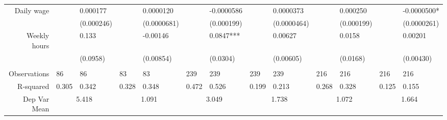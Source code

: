 \begin{tabular}{rrrrrrrrrrrrr}
Daily wage & \multicolumn{1}{l}{} & \multicolumn{1}{l}{0.000177} & \multicolumn{1}{l}{} & \multicolumn{1}{l}{0.0000120} & \multicolumn{1}{l}{} & \multicolumn{1}{l}{-0.0000586} & \multicolumn{1}{l}{} & \multicolumn{1}{l}{0.0000373} & \multicolumn{1}{l}{} & \multicolumn{1}{l}{0.000250} & \multicolumn{1}{l}{} & \multicolumn{1}{l}{-0.0000500*} \\
      & \multicolumn{1}{l}{} & \multicolumn{1}{l}{(0.000246)} & \multicolumn{1}{l}{} & \multicolumn{1}{l}{(0.0000681)} & \multicolumn{1}{l}{} & \multicolumn{1}{l}{(0.000199)} & \multicolumn{1}{l}{} & \multicolumn{1}{l}{(0.0000464)} & \multicolumn{1}{l}{} & \multicolumn{1}{l}{(0.000199)} & \multicolumn{1}{l}{} & \multicolumn{1}{l}{(0.0000261)} \\
Weekly hours & \multicolumn{1}{l}{} & \multicolumn{1}{l}{0.133} & \multicolumn{1}{l}{} & \multicolumn{1}{l}{-0.00146} & \multicolumn{1}{l}{} & \multicolumn{1}{l}{0.0847***} & \multicolumn{1}{l}{} & \multicolumn{1}{l}{0.00627} & \multicolumn{1}{l}{} & \multicolumn{1}{l}{0.0158} & \multicolumn{1}{l}{} & \multicolumn{1}{l}{0.00201} \\
      & \multicolumn{1}{l}{} & \multicolumn{1}{l}{(0.0958)} & \multicolumn{1}{l}{} & \multicolumn{1}{l}{(0.00854)} & \multicolumn{1}{l}{} & \multicolumn{1}{l}{(0.0304)} & \multicolumn{1}{l}{} & \multicolumn{1}{l}{(0.00605)} & \multicolumn{1}{l}{} & \multicolumn{1}{l}{(0.0168)} & \multicolumn{1}{l}{} & \multicolumn{1}{l}{(0.00430)} \\
      & \multicolumn{1}{l}{} & \multicolumn{1}{l}{} & \multicolumn{1}{l}{} & \multicolumn{1}{l}{} & \multicolumn{1}{l}{} & \multicolumn{1}{l}{} & \multicolumn{1}{l}{} & \multicolumn{1}{l}{} & \multicolumn{1}{l}{} & \multicolumn{1}{l}{} & \multicolumn{1}{l}{} & \multicolumn{1}{l}{} \\
       \midrule
Observations & \multicolumn{1}{l}{86} & \multicolumn{1}{l}{86} & \multicolumn{1}{l}{83} & \multicolumn{1}{l}{83} & \multicolumn{1}{l}{239} & \multicolumn{1}{l}{239} & \multicolumn{1}{l}{239} & \multicolumn{1}{l}{239} & \multicolumn{1}{l}{216} & \multicolumn{1}{l}{216} & \multicolumn{1}{l}{216} & \multicolumn{1}{l}{216} \\
R-squared & \multicolumn{1}{l}{0.305} & \multicolumn{1}{l}{0.342} & \multicolumn{1}{l}{0.328} & \multicolumn{1}{l}{0.348} & \multicolumn{1}{l}{0.472} & \multicolumn{1}{l}{0.526} & \multicolumn{1}{l}{0.199} & \multicolumn{1}{l}{0.213} & \multicolumn{1}{l}{0.268} & \multicolumn{1}{l}{0.328} & \multicolumn{1}{l}{0.125} & \multicolumn{1}{l}{0.155} \\
Dep Var Mean & \multicolumn{2}{c}{5.418} & \multicolumn{2}{c}{1.091} & \multicolumn{2}{c}{3.049} & \multicolumn{2}{c}{1.738} & \multicolumn{2}{c}{1.072} & \multicolumn{2}{c}{1.664} \\
\bottomrule
\end{tabular}%
